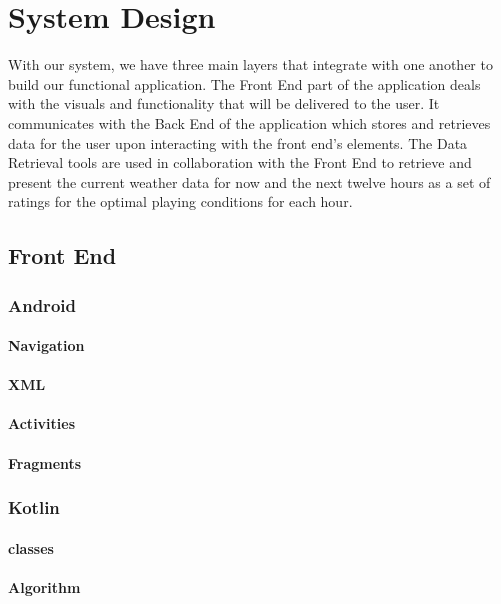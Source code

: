 \chapter{System Design}
With our system, we have three main layers that integrate with one another to build our functional application. The Front End part of the application deals with the visuals and functionality that will be delivered to the user. It communicates with the Back End of the application which stores and retrieves data for the user upon interacting with the front end’s elements. The Data Retrieval tools are used in collaboration with the Front End to retrieve and present the current weather data for now and the next twelve hours as a set of ratings for the optimal playing conditions for each hour.

\section{Front End}
\subsection{Android}
\subsubsection{Navigation}
\subsubsection{XML}
\subsubsection{Activities}
\subsubsection{Fragments}
\subsection{Kotlin}
\subsubsection{classes}
\subsubsection{Algorithm}

